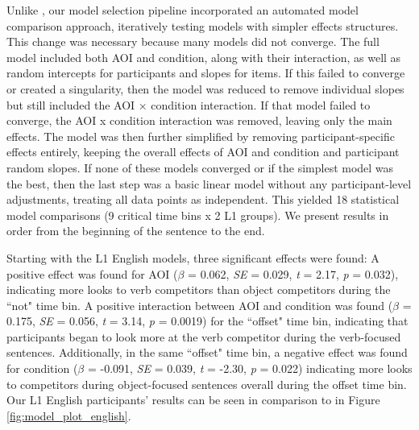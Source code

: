 Unlike \cite{ge2021a}, our model selection pipeline incorporated an automated model comparison approach, iteratively testing models with simpler effects structures. This change was necessary because many models did not converge. The full model included both AOI and condition, along with their interaction, as well as random intercepts for participants and slopes for items. If this failed to converge or created a singularity, then the model was reduced to remove individual slopes but still included the AOI × condition interaction. If that model failed to converge, the AOI x condition interaction was removed, leaving only the main effects. The model was then further simplified by removing participant-specific effects entirely, keeping the overall effects of AOI and condition and participant random slopes. If none of these models converged or if the simplest model was the best, then the last step was a basic linear model without any participant-level adjustments, treating all data points as independent. This yielded 18 statistical model comparisons (9 critical time bins x 2 L1 groups). We present results in order from the beginning of the sentence to the end. 

Starting with the L1 English models, three significant effects were found: A positive effect was found for AOI ($\beta$ = 0.062, \textit{SE} = 0.029, \textit{t} = 2.17, \textit{p} = 0.032), indicating more looks to verb competitors than object competitors during the ``not" time bin. A positive interaction between AOI and condition was found ($\beta$ = 0.175, \textit{SE} = 0.056, \textit{t} = 3.14, \textit{p} = 0.0019) for the ``offset" time bin, indicating that participants began to look more at the verb competitor during the verb-focused sentences. Additionally, in the same ``offset" time bin, a negative effect was found for condition ($\beta$ = -0.091, \textit{SE} = 0.039, \textit{t} = -2.30, \textit{p} = 0.022) indicating more looks to competitors during object-focused sentences overall during the offset time bin. Our L1 English participants' results can be seen in comparison to \cite{ge2021a} in Figure \ref{fig:model_plot_english}.

